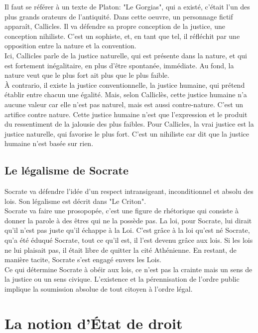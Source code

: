 \documentclass[10pt, a4paper, openany]{book}
\begin{document}
Il faut se référer à un texte de Platon: "Le Gorgias", qui a existé, c'était l'un des plus grands orateurs de l'antiquité. Dans cette oeuvre, un personnage fictif apparaît, Callicles. Il va défendre sa propre conception de la justice, une conception nihiliste. C'est un sophiste, et, en tant que tel, il réfléchit par une opposition entre la nature et la convention. \\
Ici, Callicles parle de la justice naturelle, qui est présente dans la nature, et qui est fortement inégalitaire, en plus d'être spontanée, immédiate. Au fond, la nature veut que le plus fort ait plus que le plus faible. \\
À contrario, il existe la justice conventionnelle, la justice humaine, qui prétend établir entre chacun une égalité. Mais, selon Calliclès, cette justice humaine n'a aucune valeur car elle n'est pas naturel, mais est aussi contre-nature. C'est un artifice contre nature. Cette justice humaine n'est que l'expression et le produit du ressentiment de la jalousie des plus faibles. Pour Callicles, la vrai justice est la justice naturelle, qui favorise le plus fort. C'est un nihiliste car dit que la justice humaine n'est basée sur rien. 

\subsection{Le légalisme de Socrate}

Socrate va défendre l'idée d'un respect intransigeant, inconditionnel et absolu des lois. Son légalisme est décrit dans "Le Criton". \\
Socrate va faire une prosopopée, c'est une figure de rhétorique qui consiste à donner la parole à des êtres qui ne la possède pas. La loi, pour Socrate, lui dirait qu'il n'est pas juste qu'il échappe à la Loi. C'est grâce à la loi qu'est né Socrate, qu'a été éduqué Socrate, tout ce qu'il est, il l'est devenu grâce aux lois. Si les lois ne lui plaisait pas, il était libre de quitter la cité Athénienne. En restant, de manière tacite, Socrate s'est engagé envers les Lois. \\
Ce qui détermine Socrate à obéir aux lois, ce n'est pas la crainte mais un sens de la justice ou un sens civique. L'existence et la pérennisation de l'ordre public implique la soumission absolue de tout citoyen à l'ordre légal. 

\section{La notion d'État de droit}
\end{document}
